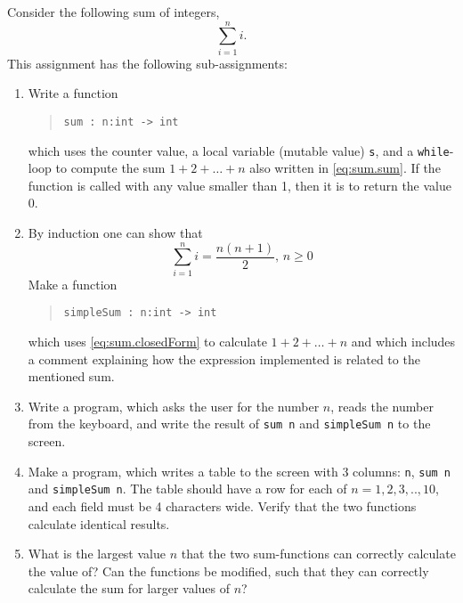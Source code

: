 Consider the following sum of integers,
\begin{equation}
  \sum_{i=1}^n i.
  \label{eq:sum.sum}
\end{equation}
This assignment has the following sub-assignments:
\begin{enumerate}
\item \label{sum} Write a function
  \begin{quote}
    \mbox{\lstinline!sum : n:int -> int!}
  \end{quote}
  which uses the counter value, a local variable (mutable value) \lstinline!s!,
  and a \lstinline!while!-loop to compute the sum $1 + 2 + \dots + n$
  also written in \eqref{eq:sum.sum}. If the function is called with any value smaller than 1, then it is to return the value 0.
\item By induction one can show that
  \begin{equation}
    \sum_{i=1}^n i = \frac{n(n+1)}{2},\, n\geq 0
    \label{eq:sum.closedForm}
  \end{equation}
  Make a function
  \begin{quote}
    \mbox{\lstinline!simpleSum : n:int -> int!}
  \end{quote}
  which uses \eqref{eq:sum.closedForm} to calculate $1 + 2 + \dots + n$ and which includes a comment explaining how the expression implemented is related to the mentioned sum.
\item Write a program, which asks the user for the number $n$, reads the number from the keyboard, and write the result of \lstinline{sum n} and \lstinline!simpleSum n! to the screen.
\item Make a program, which writes a table to the screen with 3
  columns: \lstinline!n!, \lstinline!sum n! and
  \mbox{\lstinline!simpleSum n!}. The table should have a row for each
  of $n=1,2,3,..,10$, and each field must be 4 characters wide. Verify that the two functions calculate
  identical results.
\item What is the largest value $n$ that the two sum-functions can
  correctly calculate the value of? Can the functions be modified,
  such that they can correctly calculate the sum for larger values of
  $n$?
  \end{enumerate}
